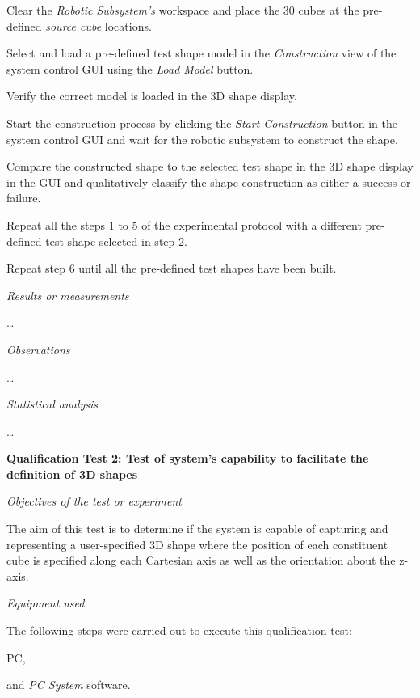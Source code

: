 \begin{compactenum}
	\item Clear the \textit{Robotic Subsystem's} workspace and place the 30 cubes at the pre-defined \textit{source cube} locations.
	\item Select and load a pre-defined test shape model in the \textit{Construction} view of the system control GUI using the \textit{Load Model} button.
	\item Verify the correct model is loaded in the 3D shape display.
	\item Start the construction process by clicking the \textit{Start Construction} button in the system control GUI and wait for the robotic subsystem to construct the shape.
	\item Compare the constructed shape to the selected test shape in the 3D shape display in the GUI and qualitatively classify the shape construction as either a success or failure.
	\item Repeat all the steps 1 to 5 of the experimental protocol with a different pre-defined test shape selected in step 2. 
	\item Repeat step 6 until all the pre-defined test shapes have been built.
\end{compactenum}

\textit{Results or measurements}

\ldots

\textit{Observations}

\ldots

\textit{Statistical analysis}

\ldots

\textbf{Qualification Test 2: Test of system's capability to facilitate the definition of 3D shapes}

\textit{Objectives of the test or experiment}

The aim of this test is to determine if the system is capable of capturing and representing a user-specified 3D shape where the position of each constituent cube is specified along each Cartesian axis as well as the orientation about the z-axis.

\textit{Equipment used}

The following steps were carried out to execute this qualification test:

\begin{compactitem}
	\item PC,
	\item and \textit{PC System} software.
\end{compactitem}

